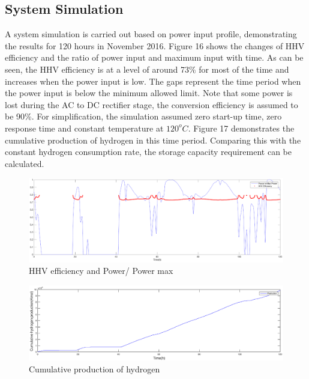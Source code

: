 \subsection{System Simulation}
A system simulation is carried out based on power input profile,  demonstrating the results for 120 hours in November 2016.  Figure 16  shows the changes of  HHV efficiency and the ratio of power input and maximum input with time. As can be seen, the HHV efficiency is at a level of around 73\% for most of the time and increases when the power input is low. The gaps represent the time period when the power input is below the minimum allowed limit. Note that some power is lost during the AC to DC rectifier stage, the conversion efficiency is assumed to be 90\%. For simplification, the simulation assumed zero start-up time, zero response time and constant temperature at $120^oC$. Figure 17 demonstrates the cumulative production of hydrogen in this time period. Comparing this with the constant hydrogen consumption rate, the storage capacity requirement can be calculated. 
\begin{figure}[H]
\centering
\includegraphics[width = 18cm]{simulation.eps}
\caption{HHV efficiency and Power/ Power max}
\end{figure}

\begin{figure}[htb]
\centering
\includegraphics[width = 17cm]{cumulative.eps}
\caption{Cumulative production of hydrogen }
\end{figure}
